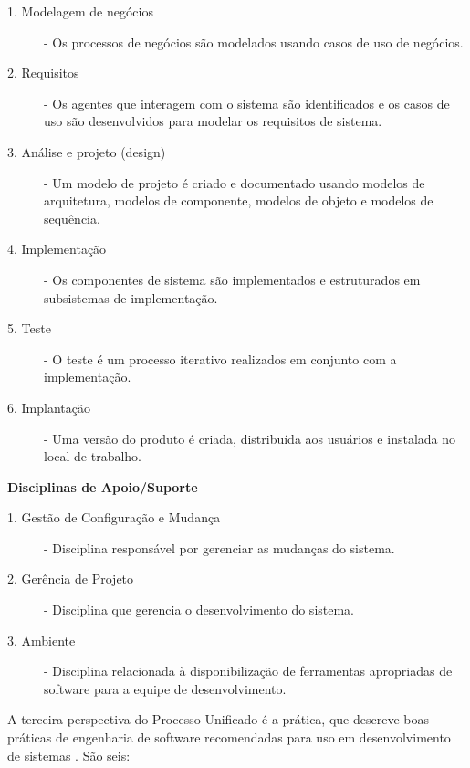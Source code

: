 \documentclass[
	article,			%
	11pt,				%
	oneside,			%
	a4paper,			%
	english,			%
	brazil,				%
	sumario=tradicional
	]{abntex2}
\begin{document}
\begin{description}
   \item[1. Modelagem de negócios] - Os processos de negócios são modelados
   usando casos de uso de negócios.
   \item[2. Requisitos] - Os agentes que interagem com o sistema são
   identificados e os casos de uso são desenvolvidos para modelar os requisitos de sistema.
   \item[3. Análise e projeto (design)] - Um modelo de projeto é criado e
   documentado usando modelos de arquitetura, modelos de componente, modelos de
   objeto e modelos de sequência.
   \item[4. Implementação] - Os componentes de sistema são implementados e
   estruturados em subsistemas de implementação.
   \item[5. Teste] - O teste é um processo iterativo realizados em conjunto com
   a implementação.
   \item[6. Implantação] - Uma versão do produto é criada, distribuída aos
   usuários e instalada no local de trabalho.
\end{description}

\textbf{Disciplinas de Apoio/Suporte}

\begin{description}
   \item[1. Gestão de Configuração e Mudança] - Disciplina responsável por
   gerenciar as mudanças do sistema.
   \item[2. Gerência de Projeto] - Disciplina que gerencia o desenvolvimento do
   sistema.
   \item[3. Ambiente] - Disciplina relacionada à disponibilização de ferramentas
   apropriadas de software para a equipe de desenvolvimento.
\end{description}

A terceira perspectiva do Processo Unificado é a prática, que descreve boas
práticas de engenharia de software recomendadas para uso em desenvolvimento de
sistemas \cite{sommerville2007}. São seis:
\end{document}
